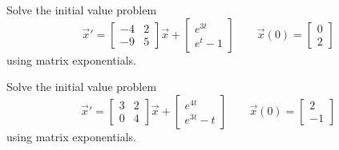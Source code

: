 \documentclass{ximera}
\begin{document}
\begin{exercise}
    Solve the initial value problem
    \[ 
        {\vec{x}}' = 
        \begin{bmatrix} 
            -4 & 2 \\ 
            -9 & 5 
        \end{bmatrix}
        \vec{x} + 
        \begin{bmatrix} 
            e^{3t} \\ 
            e^t - 1 
        \end{bmatrix} 
        \qquad \vec{x}(0) = 
        \begin{bmatrix} 
            0 \\ 
            2 
        \end{bmatrix} 
    \] 
    using matrix exponentials.
\end{exercise}

\begin{exercise}
    Solve the initial value problem
    \[
        {\vec{x}}' = 
        \begin{bmatrix} 
            3 & 2 \\ 
            0 & 4 
        \end{bmatrix}
        \vec{x} + 
        \begin{bmatrix} 
            e^{4t} \\ 
            e^{3t} - t 
        \end{bmatrix} 
        \qquad \vec{x}(0) = 
        \begin{bmatrix} 
            2 \\ 
            -1 
        \end{bmatrix} 
    \] 
    using matrix exponentials.
\end{exercise}
\end{document}
